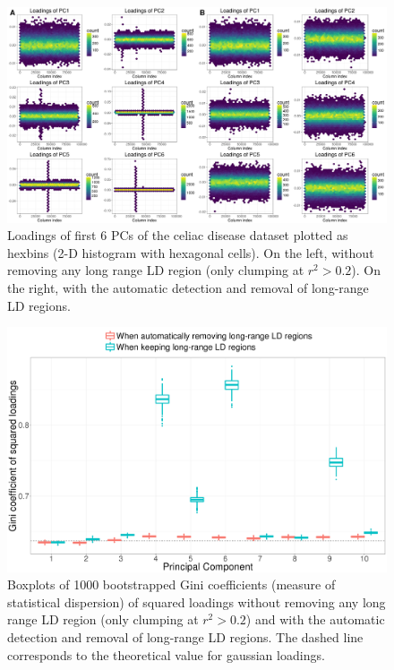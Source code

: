 \documentclass[a4paper, 11pt]{article}
\begin{document}
\vspace{3em}

\begin{figure}[!h]
\centerline{\includegraphics[width=\textwidth]{loadings}}
\caption{Loadings of first 6 PCs of the celiac disease dataset plotted as hexbins (2-D histogram with hexagonal cells). On the left, without removing any long range LD region (only clumping at $r^2 > 0.2$). On the right, with the automatic detection and removal of long-range LD regions.}\label{fig:loadings}
\end{figure}

\vspace{3em}

\begin{figure}[!h]
\centerline{\includegraphics[width=\textwidth]{gini}}
\caption{Boxplots of 1000 bootstrapped Gini coefficients (measure of statistical dispersion) of squared loadings without removing any long range LD region (only clumping at $r^2 > 0.2$) and with the automatic detection and removal of long-range LD regions. The dashed line corresponds to the theoretical value for gaussian loadings.}\label{fig:gini}
\end{figure}
\end{document}
